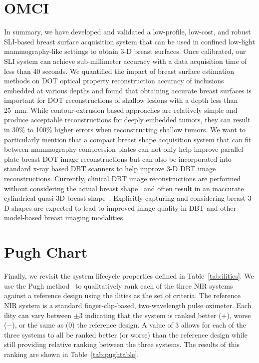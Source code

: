 \section{OMCI}
In summary, we have developed and validated a low-profile, low-cost, and robust \ac{SLI}-based breast surface acquisition system that can be used in confined low-light mammography-like settings to obtain 3-D breast surfaces. Once calibrated, our \ac{SLI} system can achieve sub-millimeter accuracy with a data acquisition time of less than 40 seconds. We quantified the impact of breast surface estimation methods on \ac{DOT} optical property reconstruction accuracy of inclusions embedded at various depths and found that obtaining accurate breast surfaces is important for \ac{DOT} reconstructions of shallow lesions with a depth less than 25~mm. While contour-extrusion based approaches are relatively simple and produce acceptable reconstructions for deeply embedded tumors, they can result in 30\% to 100\% higher errors when reconstructing shallow tumors. We want to particularly mention that a compact breast shape acquisition system that can fit between mammography compression plates can not only help improve parallel-plate breast \ac{DOT} image reconstructions but can also be incorporated into standard x-ray based \ac{DBT} scanners to help improve 3-D \ac{DBT} image reconstructions. Currently, clinical \ac{DBT} image reconstructions are performed without considering the actual breast shape~\cite{Chong2019} and often result in an inaccurate cylindrical quasi-3D breast shape~\cite{Redbird2008}. Explicitly capturing and considering breast 3-D shapes are expected to lead to improved image quality in \ac{DBT} and other model-based breast imaging modalities.



\section{Pugh Chart}

Finally, we revisit the system lifecycle properties defined in Table~\ref{tab:ilities}. We use the Pugh method~\cite{Pugh1981} to qualitatively rank each of the three \ac{NIR} systems against a reference design using the ilities as the set of criteria. The reference \ac{NIR} system is a standard finger-clip-based, two-wavelength pulse oximeter. Each ility can vary between $\pm3$ indicating that the system is ranked better ($+$), worse ($-$), or the same as ($0$) the reference design. A value of 3 allows for each of the three systems to all be ranked better (or worse) than the reference design while still providing relative ranking between the three systems. The results of this ranking are shown in Table~\ref{tab:pughtable}. 

